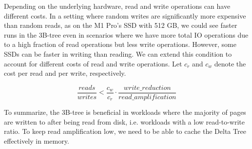 Depending on the underlying hardware, read and write operations can have different costs.
In a setting where random writes are significantly more expensive than random reads, as on the M1 Pro's SSD with 512 GB, we could see faster runs in the 3B-tree even in scenarios where we have more total \ac{IO} operations due to a high fraction of read operations but less write operations.
However, some SSDs can be faster in writing than reading.
We can extend this condition to account for different costs of read and write operations.
Let $c_r$ and $c_w$ denote the cost per read and per write, respectively.  


\begin{equation}
\frac{reads}{writes} < \frac{c_w}{c_r} \cdot
\frac{write\_reduction}{read\_amplification}
\label{eq:ratio_condition_costs}
\end{equation}

To summarize, the 3B-tree is beneficial in workloads where the majority of pages are written to after being read from disk, i.e. workloads with a low read-to-write ratio.
To keep read amplification low, we need to be able to cache the Delta Tree effectively in memory.





